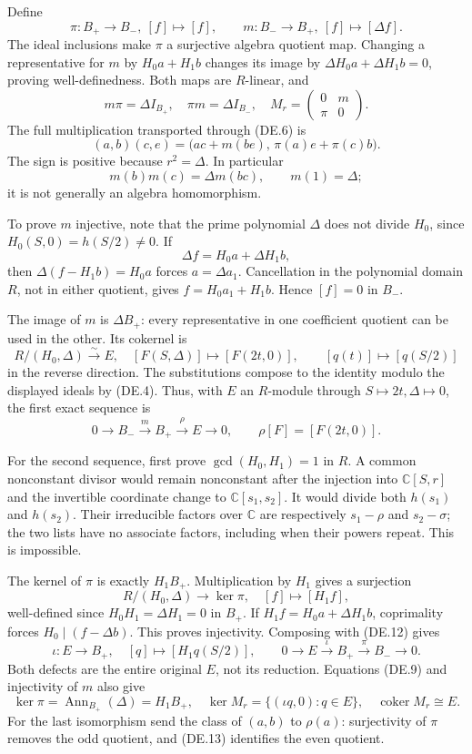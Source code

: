 Define
\[
 \pi:B_+\to B_-,\ [f]\mapsto[f],\qquad
 m:B_-\to B_+,\ [f]\mapsto[\Delta f].
 \tag{DE.8}
\]
The ideal inclusions make \(\pi\) a surjective algebra quotient map. Changing a representative for \(m\) by \(H_0a+H_1b\) changes its image by \(\Delta H_0a+\Delta H_1b=0\), proving well-definedness. Both maps are \(R\)-linear, and
\[
 m\pi=\Delta I_{B_+},\quad \pi m=\Delta I_{B_-},\quad
 M_r=\begin{pmatrix}0&m\\ \pi&0\end{pmatrix}.
 \tag{DE.9}
\]
The full multiplication transported through (DE.6) is
\[
 (a,b)(c,e)=\bigl(ac+m(be),\,\pi(a)e+\pi(c)b\bigr).
 \tag{DE.10}
\]
The sign is positive because \(r^2=\Delta\). In particular
\[
 m(b)m(c)=\Delta m(bc),\qquad m(1)=\Delta;
 \tag{DE.11}
\]
it is not generally an algebra homomorphism.

To prove \(m\) injective, note that the prime polynomial \(\Delta\) does not divide \(H_0\), since \(H_0(S,0)=h(S/2)\ne0\). If
\[
 \Delta f=H_0a+\Delta H_1b,
\]
then \(\Delta(f-H_1b)=H_0a\) forces \(a=\Delta a_1\). Cancellation in the polynomial domain \(R\), not in either quotient, gives \(f=H_0a_1+H_1b\). Hence \([f]=0\) in \(B_-\).

The image of \(m\) is \(\Delta B_+\): every representative in one coefficient quotient can be used in the other. Its cokernel is
\[
 R/(H_0,\Delta)\xrightarrow{\sim}E,\quad
 [F(S,\Delta)]\mapsto[F(2t,0)],\qquad [q(t)]\mapsto[q(S/2)]
 \tag{DE.12}
\]
in the reverse direction. The substitutions compose to the identity modulo the displayed ideals by (DE.4). Thus, with \(E\) an \(R\)-module through \(S\mapsto2t,\Delta\mapsto0\), the first exact sequence is
\[
 0\longrightarrow B_-\xrightarrow{m}B_+
 \xrightarrow{\rho}E\longrightarrow0,\qquad
 \rho[F]=[F(2t,0)].
 \tag{DE.13}
\]

For the second sequence, first prove \(\gcd(H_0,H_1)=1\) in \(R\). A common nonconstant divisor would remain nonconstant after the injection into \(\mathbb C[S,r]\) and the invertible coordinate change to \(\mathbb C[s_1,s_2]\). It would divide both \(h(s_1)\) and \(h(s_2)\). Their irreducible factors over \(\mathbb C\) are respectively \(s_1-\rho\) and \(s_2-\sigma\); the two lists have no associate factors, including when their powers repeat. This is impossible.

The kernel of \(\pi\) is exactly \(H_1B_+\). Multiplication by \(H_1\) gives a surjection
\[
 R/(H_0,\Delta)\to\ker\pi,\quad[f]\mapsto[H_1f],
\]
well-defined since \(H_0H_1=\Delta H_1=0\) in \(B_+\). If \(H_1f=H_0a+\Delta H_1b\), coprimality forces \(H_0\mid(f-\Delta b)\). This proves injectivity. Composing with (DE.12) gives
\[
 \iota:E\to B_+,\quad[q]\mapsto[H_1q(S/2)],\qquad
 0\longrightarrow E\xrightarrow{\iota}B_+
 \xrightarrow{\pi}B_-\longrightarrow0.
 \tag{DE.14}
\]
Both defects are the entire original \(E\), not its reduction. Equations (DE.9) and injectivity of \(m\) also give
\[
 \ker\pi=\operatorname{Ann}_{B_+}(\Delta)=H_1B_+,\quad
 \ker M_r=\{(\iota q,0):q\in E\},\quad
 \operatorname{coker}M_r\cong E.
 \tag{DE.15}
\]
For the last isomorphism send the class of \((a,b)\) to \(\rho(a)\): surjectivity of \(\pi\) removes the odd quotient, and (DE.13) identifies the even quotient.

